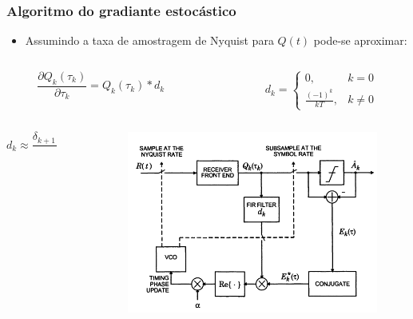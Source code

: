 \begin{frame}
	\frametitle{Algoritmo do gradiante estocástico}
	\begin{itemize}
		\item \begin{small} Assumindo a taxa de amostragem de Nyquist para $Q(t)$ pode-se  aproximar: \end{small}	
	\end{itemize}
	
	\begin{columns}
		\begin{column}{0.5\columnwidth}
			\begin{equation*}
			\frac{\partial Q_k(\tau_k)}{\partial \tau_k} = Q_k(\tau_k) * d_k
			\end{equation*}
		\end{column}
		~
		\begin{column}{0.5\columnwidth}
			\begin{equation*}
			d_k = \begin{cases}
			0 , & k=0\\
			\frac{(-1)^k}{kT}, & k \neq 0
			\end{cases}
			\end{equation*}
		\end{column}
	\end{columns}
	
	\begin{columns}
		\begin{column}{0.5\columnwidth}
			\begin{equation*}
			d_k  \approx \frac{\delta_{k+1}-\delta_{k-1}}{T}
			\end{equation*}
		\end{column}
		~
		\begin{column}{0.5\columnwidth}
			\begin{figure}
				\includegraphics[width=\textwidth]{figs/aproximacao_gradiente}
			\end{figure}
		\end{column}
	\end{columns}
		
\end{frame}

